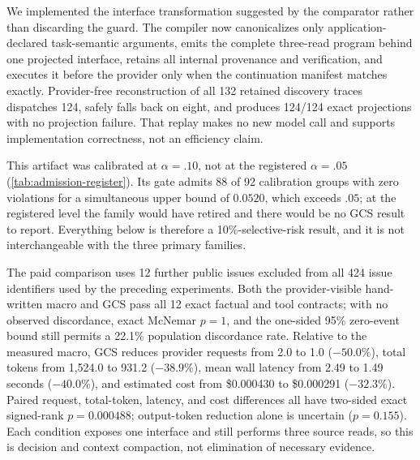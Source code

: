 \begin{table}[t]
  \centering
  \caption{Fresh real-record comparison after adding guarded composite synthesis.
  ``Exposed'' counts model-visible interfaces; both conditions execute three source
  reads.  GCS runs the admitted composite before the first provider request.  This is a
  12-pair exploratory extension designed after the earlier macro result, not a
  confirmatory replacement for \cref{tab:natural-replication}.}
  \label{tab:gcs-live}
  \small
  \resizebox{\columnwidth}{!}{}
\end{table}

We implemented the interface transformation suggested by the comparator rather than
discarding the guard.  The compiler now canonicalizes only application-declared
task-semantic arguments, emits the complete three-read program behind one projected
interface, retains all internal provenance and verification, and executes it before the
provider only when the continuation manifest matches exactly.  Provider-free
reconstruction of all 132 retained discovery traces dispatches 124, safely falls back on
eight, and produces 124/124 exact projections with no projection failure.  That replay
makes no new model call and supports implementation correctness, not an efficiency claim.

This artifact was calibrated at $\alpha=.10$, not at the registered $\alpha=.05$
(\cref{tab:admission-register}).  Its gate admits 88 of 92 calibration groups with zero
violations for a simultaneous upper bound of $0.0520$, which exceeds $.05$; at the
registered level the family would have retired and there would be no GCS result to report.
Everything below is therefore a 10\%-selective-risk result, and it is not interchangeable
with the three primary families.

The paid comparison uses 12 further public issues excluded from all 424 issue identifiers
used by the preceding experiments.  Both the provider-visible hand-written macro and GCS
pass all 12 exact factual and tool contracts; with no observed discordance, exact McNemar
$p=1$, and the one-sided 95\% zero-event bound still permits a 22.1\% population
discordance rate.  Relative to the measured macro, GCS reduces provider requests from
2.0 to 1.0 ($-50.0\%$), total tokens from 1,524.0 to 931.2
($-38.9\%$), mean wall latency from 2.49 to 1.49 seconds
($-40.0\%$), and estimated cost from \$0.000430 to \$0.000291
($-32.3\%$).  Paired request, total-token, latency, and cost differences all have
two-sided exact signed-rank $p=0.000488$; output-token reduction alone is uncertain
($p=0.155$).  Each condition exposes one interface and still performs three source
reads, so this is decision and context compaction, not elimination of necessary evidence.

